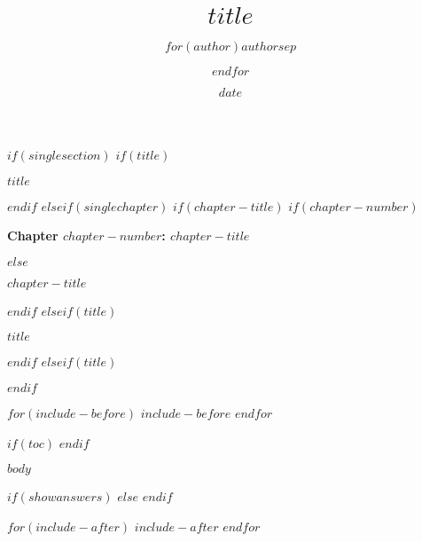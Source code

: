 \documentclass[
$if(fontsize)$
  $fontsize$,
$endif$
$if(lang)$
  $babel-lang$,
$endif$
$if(papersize)$
  $papersize$paper,
$endif$
$for(classoption)$
  $classoption$$sep$,
$endfor$
]{$documentclass$}
\title{$title$}
\author{$for(author)$$author$$sep$ \and $endfor$}
\date{$date$}
\begin{document}
$if(singlesection)$
  $if(title)$
    {\centering\LARGE\bfseries $title$ \par\bigskip}
  $endif$
$elseif(singlechapter)$
  $if(chapter-title)$
    $if(chapter-number)$
      {\centering\Huge\bfseries Chapter $chapter-number$: $chapter-title$ \par\bigskip}
    $else$
      {\noindent\Huge\bfseries $chapter-title$ \par\bigskip}
    $endif$
  $elseif(title)$
     {\centering\LARGE\bfseries $title$ \par\bigskip}
  $endif$
$elseif(title)$
  \maketitle
$endif$

$for(include-before)$
$include-before$
$endfor$

$if(toc)$
{
\setcounter{tocdepth}{$toc-depth$}
\tableofcontents
}
$endif$

$body$

$if(showanswers)$
$else$
$endif$

$for(include-after)$
$include-after$
$endfor$
\end{document}
